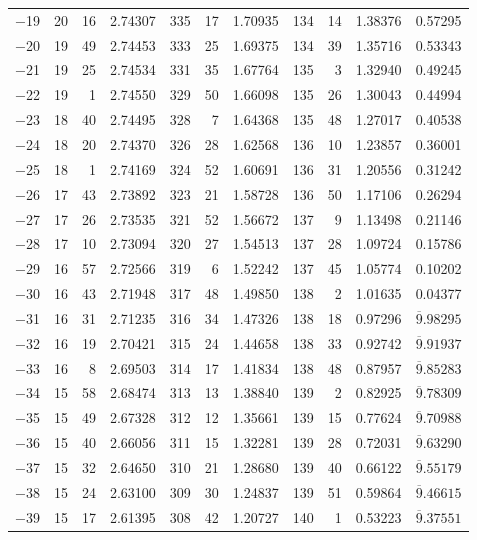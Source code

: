\documentclass[12pt,a4paper]{article}
\begin{document}
\begin{small}
\begin{longtable}{@{}r|rr|rr|rr|rr|rr@{}}
$-$19 & 20 & 16 & 2.74307 & 335 & 17 & 1.70935 & 134 & 14 & 1.38376 & 0.57295 \\
$-$20 & 19 & 49 & 2.74453 & 333 & 25 & 1.69375 & 134 & 39 & 1.35716 & 0.53343 \\
$-$21 & 19 & 25 & 2.74534 & 331 & 35 & 1.67764 & 135 & 3 & 1.32940 & 0.49245 \\
$-$22 & 19 & 1 & 2.74550 & 329 & 50 & 1.66098 & 135 & 26 & 1.30043 & 0.44994 \\
$-$23 & 18 & 40 & 2.74495 & 328 & 7 & 1.64368 & 135 & 48 & 1.27017 & 0.40538 \\
$-$24 & 18 & 20 & 2.74370 & 326 & 28 & 1.62568 & 136 & 10 & 1.23857 & 0.36001 \\
$-$25 & 18 & 1 & 2.74169 & 324 & 52 & 1.60691 & 136 & 31 & 1.20556 & 0.31242 \\
$-$26 & 17 & 43 & 2.73892 & 323 & 21 & 1.58728 & 136 & 50 & 1.17106 & 0.26294 \\
$-$27 & 17 & 26 & 2.73535 & 321 & 52 & 1.56672 & 137 & 9 & 1.13498 & 0.21146 \\
$-$28 & 17 & 10 & 2.73094 & 320 & 27 & 1.54513 & 137 & 28 & 1.09724 & 0.15786 \\
$-$29 & 16 & 57 & 2.72566 & 319 & 6 & 1.52242 & 137 & 45 & 1.05774 & 0.10202 \\
$-$30 & 16 & 43 & 2.71948 & 317 & 48 & 1.49850 & 138 & 2 & 1.01635 & 0.04377 \\
$-$31 & 16 & 31 & 2.71235 & 316 & 34 & 1.47326 & 138 & 18 & 0.97296 & $\overline{9}.98295$ \\
$-$32 & 16 & 19 & 2.70421 & 315 & 24 & 1.44658 & 138 & 33 & 0.92742 & $\overline{9}.91937$ \\
$-$33 & 16 & 8 & 2.69503 & 314 & 17 & 1.41834 & 138 & 48 & 0.87957 & $\overline{9}.85283$ \\
$-$34 & 15 & 58 & 2.68474 & 313 & 13 & 1.38840 & 139 & 2 & 0.82925 & $\overline{9}.78309$ \\
$-$35 & 15 & 49 & 2.67328 & 312 & 12 & 1.35661 & 139 & 15 & 0.77624 & $\overline{9}.70988$ \\
$-$36 & 15 & 40 & 2.66056 & 311 & 15 & 1.32281 & 139 & 28 & 0.72031 & $\overline{9}.63290$ \\
$-$37 & 15 & 32 & 2.64650 & 310 & 21 & 1.28680 & 139 & 40 & 0.66122 & $\overline{9}.55179$ \\
$-$38 & 15 & 24 & 2.63100 & 309 & 30 & 1.24837 & 139 & 51 & 0.59864 & $\overline{9}.46615$ \\
$-$39 & 15 & 17 & 2.61395 & 308 & 42 & 1.20727 & 140 & 1 & 0.53223 & $\overline{9}.37551$ \\

\end{longtable}
\end{small}
\end{document}
